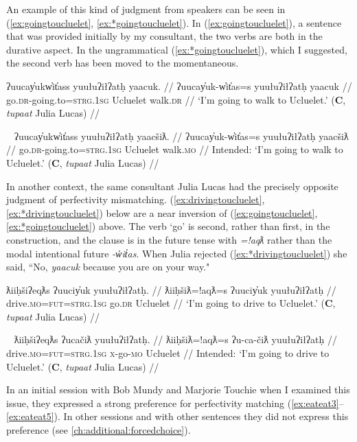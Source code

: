 An example of this kind of judgment from speakers can be seen in (\ref{ex:goingtoucluelet}, \ref{ex:*goingtoucluelet}). In (\ref{ex:goingtoucluelet}), a sentence that was provided initially by my consultant, the two verbs are both in the durative aspect. In the ungrammatical (\ref{ex:*goingtoucluelet}), which I suggested, the second verb has been moved to the momentaneous.

\ex \label{ex:goingtoucluelet}
\begingl
\glpreamble ʔuucay̓ukw̓it̓ass yuułuʔiłʔatḥ yaacuk. //
\gla ʔuucay̓uk-w̓it̓as=s yuułuʔiłʔatḥ yaacuk //
\glb go.\textsc{dr}-going.to=\textsc{strg.1sg} Ucluelet walk.\textsc{dr} //
\glft `I'm going to walk to Ucluelet.' (\textbf{C}, \textit{tupaat} Julia Lucas) //
\endgl
\xe

\ex~ \label{ex:*goingtoucluelet}
\begingl
\glpreamble *ʔuucay̓ukw̓it̓ass yuułuʔiłʔatḥ yaacšiƛ. //
\gla ʔuucay̓uk-w̓it̓as=s yuułuʔiłʔatḥ yaacšiƛ //
\glb go.\textsc{dr}-going.to=\textsc{strg.1sg} Ucluelet walk.\textsc{mo} //
\glft Intended: `I'm going to walk to Ucluelet.' (\textbf{C}, \textit{tupaat} Julia Lucas) //
\endgl
\xe

In another context, the same consultant Julia Lucas had the precisely opposite judgment of perfectivity mismatching. (\ref{ex:drivingtoucluelet}, \ref{ex:*drivingtoucluelet}) below are a near inversion of (\ref{ex:goingtoucluelet}, \ref{ex:*goingtoucluelet}) above. The verb `go' is second, rather than first, in the construction, and the clause is in the future tense with \textit{=!aqƛ} rather than the modal intentional future \textit{-w̓it̓as}.  When Julia rejected (\ref{ex:*drivingtoucluelet}) she said, ``No, \textit{yaacuk} because you are on your way."

\ex \label{ex:drivingtoucluelet}
\begingl
\glpreamble ƛiiḥšiʔeqƛs ʔuuciy̓uk yuułuʔiłʔatḥ. //
\gla ƛiiḥšiƛ=!aqƛ=s ʔuuciy̓uk yuułuʔiłʔatḥ //
\glb drive.\textsc{mo}=\textsc{fut}=\textsc{strg.1sg} go.\textsc{dr} Ucluelet //
\glft `I'm going to drive to Ucluelet.' (\textbf{C}, \textit{tupaat} Julia Lucas) //
\endgl
\xe

\ex~ \label{ex:*drivingtoucluelet}
\begingl
\glpreamble *ƛiiḥšiʔeqƛs ʔucačiƛ yuułuʔiłʔatḥ. //
\gla ƛiiḥšiƛ=!aqƛ=s ʔu-ca-čiƛ yuułuʔiłʔatḥ //
\glb drive.\textsc{mo}=\textsc{fut}=\textsc{strg.1sg} \textsc{x}-go-\textsc{mo} Ucluelet //
\glft Intended: `I'm going to drive to Ucluelet.' (\textbf{C}, \textit{tupaat} Julia Lucas) //
\endgl
\xe

In an initial session with Bob Mundy and Marjorie Touchie when I examined this issue, they expressed a strong preference for perfectivity matching (\ref{ex:eateat3}--\ref{ex:eateat5}). In other sessions and with other sentences they did not express this preference (see \cref{ch:additional:forcedchoice}).

